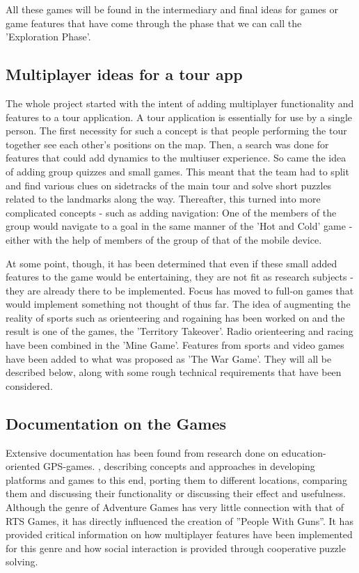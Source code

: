 All these games will be found in the intermediary and final ideas for games or
game features that have come through the phase that we can call the
'Exploration Phase'.


\subsection{Multiplayer ideas for a tour app}

The whole project started with the intent of adding multiplayer functionality
and features to a tour application. A tour application is essentially for use by
a single person. The first necessity for such a concept is that people
performing the tour together see each other's positions on the map. Then, a
search was done for features that could add dynamics to the multiuser
experience. So came the idea of adding group quizzes and small games. This meant
that the team had to split and find various clues on sidetracks of the main tour
and solve short puzzles related to the landmarks along the way. Thereafter, this
turned into more complicated concepts - such as adding navigation: One of the
members of the group would navigate to a goal in the same manner of the 'Hot and
Cold' game - either with the help of members of the group of that of the mobile
device.\newline

At some point, though, it has been determined that even if these small added
features to the game would be entertaining, they are not fit as research
subjects - they are already there to be implemented. Focus has moved to full-on
games that would implement something not thought of thus far. The idea of
augmenting the reality of sports such as orienteering and rogaining has been
worked on and the result is one of the games, the 'Territory Takeover'. Radio
orienteering and racing have been combined in the 'Mine Game'. Features from
sports and video games have been added to what was proposed as 'The War Game'.
They will all be described below, along with some rough technical requirements
that have been considered.

\subsection{Documentation on the Games}
Extensive documentation has been found from research done on education-oriented
GPS-games.\cite{pbarg1} \cite{pbarg2} \cite{pbarg3} \cite{pbarg4} \cite{pbarg5}
\cite{pbarg6}, describing concepts and approaches in developing platforms and
games to this end\cite{pbarg3}, porting them to different
locations\cite{pbarg4}, comparing them and discussing their
functionality\cite{pbarg6} \cite{pbarg1} \cite{pbarg2} or discussing their
effect and usefulness\cite{pbarg1}. Although the genre of Adventure
Games has very little connection with that of RTS Games, it has directly
influenced the creation of ''People With Guns''. It has provided critical
information on how multiplayer features have been implemented for this genre and
how social interaction is provided through cooperative puzzle solving.\newline

